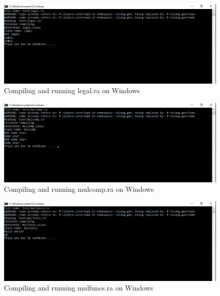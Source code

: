 \documentclass[a4paper]{article}
\begin{document}
\begin{appendices}
	\newpage
	\begin{figure}[h!]
		\centering
		\includegraphics[width=\linewidth]{images/windows_legal.png}
		\caption[Compiling and running legal.ra on Windows 10 32-bit]{Compiling and running legal.ra on Windows}
		\label{fig:windows_legal}
	\end{figure}
	\begin{figure}[h!]
		\centering
		\includegraphics[width=\linewidth]{images/windows_mulcomp.png}
		\caption[Compiling and running mulcomp.ra on Windows 10 32-bit]{Compiling and running mulcomp.ra on Windows}
		\label{fig:windows_mulcomp}
	\end{figure}
	\begin{figure}[h!]
		\centering
		\includegraphics[width=\linewidth]{images/windows_mulfuncs.png}
		\caption[Compiling and running mulfuncs.ra on Windows 10 32-bit]{Compiling and running mulfuncs.ra on Windows}
		\label{fig:windows_mulfuncs}
	\end{figure}
	\newpage
	\begin{figure}[h!]
		\centering

\end{figure}
\end{appendices}
\end{document}

